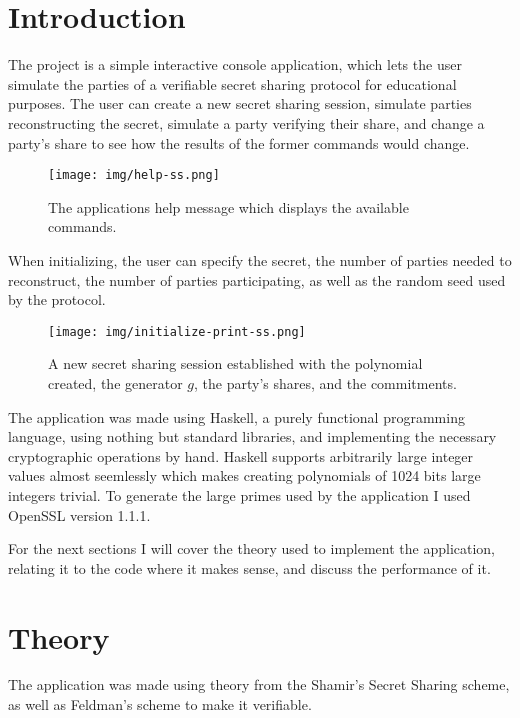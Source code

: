 \documentclass[a4paper,oneside,12pt,final]{article}
\begin{document}
 


\newpage

\section{Introduction} 

The project is a simple interactive console application, which lets the user
simulate the parties of a verifiable secret sharing protocol for educational
purposes. The user can create a new secret sharing session, simulate parties
reconstructing the secret, simulate a party verifying their share, and change a
party's share to see how the results of the former commands would change.

\begin{figure}[h]
\label{fig:help}
\center
\texttt{[image: img/help-ss.png]}
\caption{The applications help message which displays the available commands.}
\end{figure}

When initializing, the user can specify the secret, the number of parties needed
to reconstruct, the number of parties participating, as well as the random seed
used by the protocol.

\begin{figure}[h]
\label{fig:initialize-secret-sharing}
\center
\texttt{[image: img/initialize-print-ss.png]}
\caption{A new secret sharing session established with the polynomial created, 
         the generator $g$, the party's shares, and the commitments.}
\end{figure}

The application was made using Haskell, a purely functional programming
language, using nothing but standard libraries, and implementing the necessary
cryptographic operations by hand. Haskell supports arbitrarily large integer
values almost seemlessly which makes creating polynomials of 1024 bits large
integers trivial. To generate the large primes used by the application I used
OpenSSL version 1.1.1.

For the next sections I will cover the theory used to implement the application,
relating it to the code where it makes sense, and discuss the performance of it.

\section{Theory}

The application was made using theory from the Shamir's Secret Sharing
scheme, as well as Feldman's scheme to make it verifiable. 
\end{document}
